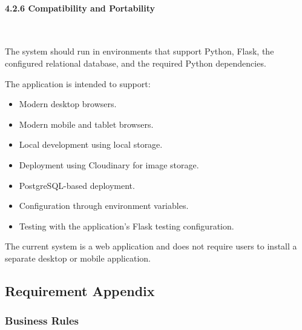 \paragraph*{4.2.6 Compatibility and Portability}\leavevmode\\[-0.5em]
\label{par:compatibility-portability}

The system should run in environments that support Python, Flask, the configured relational database, and the required Python dependencies.

The application is intended to support:

\begin{itemize}[leftmargin=1.5em, nosep]
    \item Modern desktop browsers.
    \item Modern mobile and tablet browsers.
    \item Local development using local storage.
    \item Deployment using Cloudinary for image storage.
    \item PostgreSQL-based deployment.
    \item Configuration through environment variables.
    \item Testing with the application's Flask testing configuration.
\end{itemize}

The current system is a web application and does not require users to install a separate desktop or mobile application.

\subsection{Requirement Appendix}
\label{subsec:requirement-appendix}

\subsubsection{Business Rules}
\label{subsubsec:business-rules}

